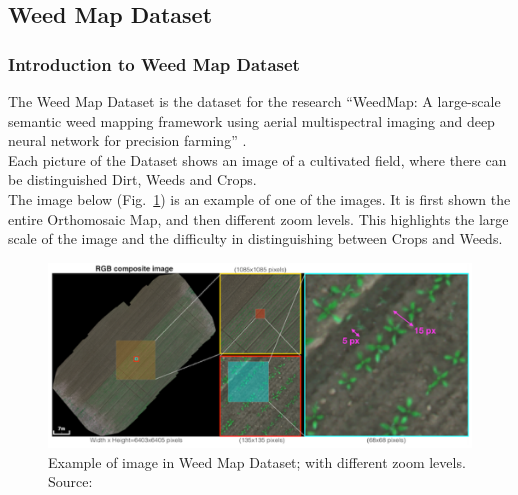 \subsection{Weed Map Dataset}

\subsubsection{Introduction to Weed Map Dataset}

The Weed Map Dataset is the dataset for the research “WeedMap: A large-scale semantic weed mapping framework using aerial multispectral imaging and deep neural network for precision farming” \cite{Tesi-2.1}.
\\[0.3cm]Each picture of the Dataset shows an image of a cultivated field, where there can be distinguished Dirt, Weeds and Crops.
\\[0.3cm]The image below (Fig.~\ref{fig:figure-4.5.1}) is an example of one of the images. It is first shown the entire Orthomosaic Map, and then different zoom levels. This highlights the large scale of the image and the difficulty in distinguishing between Crops and Weeds.
\begin{figure}[t]
	\centering
	\includegraphics[width=14cm]{figures/figure-4.5.1.png}
	\caption[Example of image in Weed Map Dataset]{Example of image in Weed Map Dataset; with different zoom levels. Source:~\cite{Tesi-2.1}}
	\label{fig:figure-4.5.1}
\end{figure}

